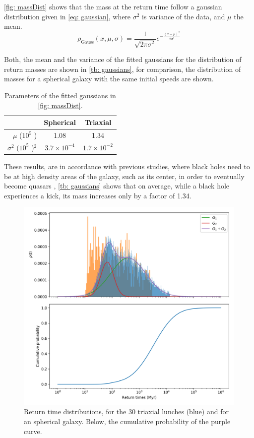 	\autoref{fig: massDist} shows that the mass at the return time follow a gaussian distribution given in \autoref{eq: gaussian}, where $\sigma^2$ is variance of the data, and $\mu$ the mean.
	\begin{equation}\label{eq: gaussian}
		\rho_\text{Gauss}(x, \mu, \sigma) = \dfrac{1}{\sqrt{2\pi\sigma^2}}e^{-\frac{(x - \mu)^2}{2\sigma^2}}
	\end{equation}
	
	Both, the mean and the variance of the fitted gaussians for the distribution of return masses are shown in \autoref{tb: gaussians}, for comparison, the distribution of masses for a spherical galaxy with the same initial speeds are shown.
	\begin{table}[h]
		\centering
		\caption{Parameters of the fitted gaussians in \autoref{fig: massDist}.}
		\begin{tabular}{r|cc}
			\hline
			& \textbf{Spherical} & \textbf{Triaxial} \\
			\hline
			$\mu$ ($10^5$ \sm)& 1.08 & 1.34 \\
			$\sigma^2$ ($10^5$ \sm)$^2$& $3.7\times10^{-4}$ & $1.7\times10^{-2}$\\
			\hline
		\end{tabular}
		\label{tb: gaussians}
	\end{table}

	These results, are in accordance with previous studies, where black holes need to be at high density areas of the galaxy, such as its center, in order to eventually become quasars \cite{tanaka2009assembly}, \autoref{tb: gaussians} shows that on average, while a black hole experiences a kick, its mass increases only by a factor of 1.34.

	\begin{figure}[h]
		\centering
		\includegraphics[width = 0.8\linewidth]{"../Files/Week 14/dist_times"}
		\caption{Return time distributions, for the 30 triaxial lunches (blue) and for an spherical galaxy. Below, the cumulative probability of the purple curve.}
		\label{fig: timeDist}
	\end{figure}

